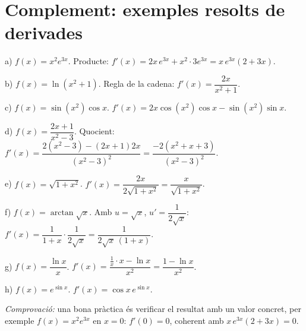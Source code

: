 \section{Complement: exemples resolts de derivades}

a) $f(x)=x^2e^{3x}$. Producte: $f'(x)=2x\,e^{3x}+x^2\cdot3e^{3x}=x\,e^{3x}(2+3x)$.

b) $f(x)=\ln(x^2+1)$. Regla de la cadena: $f'(x)=\dfrac{2x}{x^2+1}$.

c) $f(x)=\sin(x^2)\cos x$. $f'(x)=2x\cos(x^2)\cos x-\sin(x^2)\sin x$.

d) $f(x)=\dfrac{2x+1}{x^2-3}$. Quocient: $f'(x)=\dfrac{2(x^2-3)-(2x+1)2x}{(x^2-3)^2}=\dfrac{-2(x^2+x+3)}{(x^2-3)^2}$.

e) $f(x)=\sqrt{1+x^2}$. $f'(x)=\dfrac{2x}{2\sqrt{1+x^2}}=\dfrac{x}{\sqrt{1+x^2}}$.

f) $f(x)=\arctan\sqrt x$. Amb $u=\sqrt x$, $u'=\dfrac1{2\sqrt x}$: $f'(x)=\dfrac{1}{1+x}\cdot\dfrac{1}{2\sqrt x}=\dfrac{1}{2\sqrt x\,(1+x)}$.

g) $f(x)=\dfrac{\ln x}{x}$. $f'(x)=\dfrac{\frac1x\cdot x-\ln x}{x^2}=\dfrac{1-\ln x}{x^2}$.

h) $f(x)=e^{\sin x}$. $f'(x)=\cos x\,e^{\sin x}$.

\emph{Comprovació:} una bona pràctica és verificar el resultat amb un valor concret, per exemple $f(x)=x^2e^{3x}$ en $x=0$: $f'(0)=0$, coherent amb $x\,e^{3x}(2+3x)=0$.
